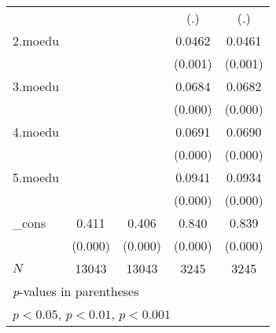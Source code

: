 {\begin{tabular}{l*{4}{c}}
            &                     &                     &         (.)         &         (.)         \\
[1em]
2.moedu     &                     &                     &      0.0462\sym{**} &      0.0461\sym{**} \\
            &                     &                     &     (0.001)         &     (0.001)         \\
[1em]
3.moedu     &                     &                     &      0.0684\sym{***}&      0.0682\sym{***}\\
            &                     &                     &     (0.000)         &     (0.000)         \\
[1em]
4.moedu     &                     &                     &      0.0691\sym{***}&      0.0690\sym{***}\\
            &                     &                     &     (0.000)         &     (0.000)         \\
[1em]
5.moedu     &                     &                     &      0.0941\sym{***}&      0.0934\sym{***}\\
            &                     &                     &     (0.000)         &     (0.000)         \\
[1em]
\_cons      &       0.411\sym{***}&       0.406\sym{***}&       0.840\sym{***}&       0.839\sym{***}\\
            &     (0.000)         &     (0.000)         &     (0.000)         &     (0.000)         \\
\hline
\(N\)       &       13043         &       13043         &        3245         &        3245         \\
\hline\hline
\multicolumn{5}{l}{\footnotesize \textit{p}-values in parentheses}\\
\multicolumn{5}{l}{\footnotesize \sym{*} \(p<0.05\), \sym{**} \(p<0.01\), \sym{***} \(p<0.001\)}\\
\end{tabular}
{
{\trowd{}\clbrdrt{}\brdrs{}\clbrdrt{}\brdrs{}\clbrdrt{}\brdrs{}\clbrdrt{}\brdrs{}\clbrdrt{}\brdrs{}\pard\intbl\ql {}\cell \pard\intbl{}\cell \pard\intbl{}\cell \pard\intbl{}\cell \pard\intbl{}\cell\row}
{\trowd{}\pard\intbl\ql {}\cell \pard\intbl{}\cell \pard\intbl{}\cell \pard\intbl{}\cell \pard\intbl{}\cell\row}
}}
